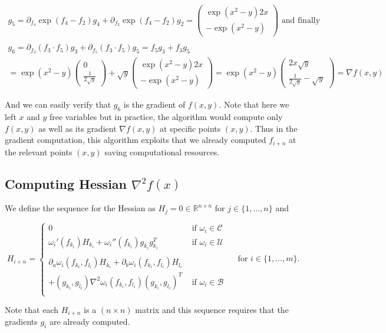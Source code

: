 \documentclass[11pt,a4paper]{article}
\def\R{{\mathbb R}}
\theoremstyle{definition} %
\begin{document}
\begin{gather*}
	g_5 =
	\partial_{f_4} \exp (f_4 - f_2) g_4
	+ \partial_{f_2} \exp (f_4 - f_2) g_2
	= \begin{pmatrix}
		\exp (x^2 - y) 2x \\
		- \exp (x^2 - y)
	\end{pmatrix}
	\text{ and finally } \\ \\
	g_6 =
	\partial_{f_3} ( f_3 \cdot f_5 ) g_3 +
	\partial_{f_5} ( f_3 \cdot f_5 ) g_5
	= f_5 g_3 + f_3 g_5 \\
	=
	\exp (x^2 - y) \begin{pmatrix} 0 \\
		\frac{ 1 }{ 2 \sqrt{y} }
	\end{pmatrix}
	+ \sqrt{y}
	\begin{pmatrix}
		\exp (x^2 - y) 2x \\
		- \exp (x^2 - y)
	\end{pmatrix}
	=
	\exp (x^2 - y)
	\begin{pmatrix}
		2x \sqrt{y} \\
		\frac{ 1 }{ 2 \sqrt{y} } - \sqrt{y}
	\end{pmatrix}
	= \nabla f(x, y)
\end{gather*}

And we can easily verify that $g_6$ is the gradient of $f(x,y)$.
Note that here we left $x$ and $y$ free variables but in practice, the
algorithm would compute only $f(x,y)$ as well as its gradient
$\nabla f(x,y)$ at specific points $(x,y)$. Thus in the gradient computation,
this algorithm exploits that we already computed $f_{i+n}$ at the relevant
points $(x,y)$ saving computational resources.

\subsection{Computing Hessian $\nabla^2 f(x)$}

We define the sequence for the Hessian as $H_j = 0 \in \R^{n \times n}$
for
$j \in \{
	1, \ldots, n
	\} $ and

\[
	H_{i+n} = \begin{cases}
		0
		 & \text{ if } \omega_i \in \mathcal{C} \\
		\omega_i ' (f_{k_i}) H_{k_i} + \omega_i '' (f_{k_i})
		g_{k_i}
		g_{k_i} ^T
		 & \text{ if } \omega_i \in \mathcal{U} \\ \\
		\partial_a \omega_i (f_{k_i}, f_{l_i}) H_{k_i} +
		\partial_b \omega_i (f_{k_i}, f_{l_i}) H_{l_i}
		 &                                      \\
		+ (g_{k_i}, g_{l_i}) \nabla ^2 \omega_i (f_{k_i}, f_{l_i})
		(g_{k_i}, g_{l_i})^T
		 & \text{ if } \omega_i \in \mathcal{B} \\
	\end{cases}
	\quad \text{ for }
	i \in \{
	1, \ldots, m
	\}.
\]

Note that each $H_{i+n}$ is a $(n \times n)$ matrix and this sequence
requires that the gradients $g_i$ are already computed.
\end{document}
